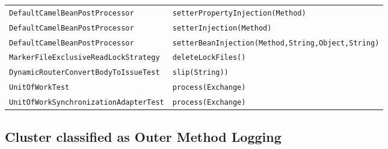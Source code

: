 \begin{center}
\begin{longtable}{ll}
\lstinline/DefaultCamelBeanPostProcessor/&{\lstinline/setterPropertyInjection(Method)/}\\
\lstinline/DefaultCamelBeanPostProcessor/&{\lstinline/setterInjection(Method)/}\\
\lstinline/DefaultCamelBeanPostProcessor/&{\lstinline/setterBeanInjection(Method,String,Object,String)/}\\
\lstinline/MarkerFileExclusiveReadLockStrategy/&{\lstinline/deleteLockFiles()/}\\
\lstinline/DynamicRouterConvertBodyToIssueTest/&{\lstinline/slip(String))/}\\
\lstinline/UnitOfWorkTest/&{\lstinline/process(Exchange)/}\\
\lstinline/UnitOfWorkSynchronizationAdapterTest/&{\lstinline/process(Exchange)/}\\
\end{longtable}
\end{center}


\subsection{Cluster classified as Outer Method Logging}

